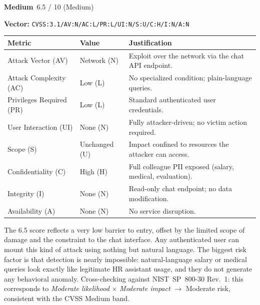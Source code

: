 \documentclass[12pt,a4paper]{report}
\newcommand{\badgemedium}{\colorbox{gray!15}{\footnotesize\textbf{Medium}}}
\newcommand{\cvssvec}[1]{\texttt{\small #1}}
\begin{document}
\begin{cvssbox}{\badgemedium\ 6.5 / 10 (Medium)}
\vspace{2pt}
\begin{center}
\textbf{Vector:}\enspace
\cvssvec{CVSS:3.1/AV:N/AC:L/PR:L/UI:N/S:U/C:H/I:N/A:N}
\end{center}
\vspace{8pt}
\begin{tabular}{W{3.4cm}W{2.2cm}W{7.8cm}}
\toprule
  
  \small\textbf{Metric} &
  \small\textbf{Value} &
  \small\textbf{Justification} \\
  \midrule
  
  \small Attack Vector (AV)     & \small Network (N) & \small Exploit over the network via the chat API endpoint. \\
  
  \small Attack Complexity (AC) & \small Low (L)     & \small No specialized condition; plain-language queries. \\
  
  \small Privileges Required (PR)  & \small Low (L) & \small Standard authenticated user credentials. \\
  
  \small User Interaction (UI)  & \small None (N)    & \small Fully attacker-driven; no victim action required. \\
  
  \small Scope (S)              & \small Unchanged (U) & \small Impact confined to resources the attacker can access. \\
  
  \small Confidentiality (C)    & \small High (H)    & \small Full colleague PII exposed (salary, medical, evaluation). \\
  
  \small Integrity (I)          & \small None (N)    & \small Read-only chat endpoint; no data modification. \\
  
  \small Availability (A)       & \small None (N)    & \small No service disruption. \\
  \bottomrule
\end{tabular}
\vspace{6pt}

\small The 6.5 score reflects a very low barrier to entry, offset by the
limited scope of damage and the constraint to the chat interface. Any
authenticated user can mount this kind of attack using nothing but natural
language. The biggest risk factor is that detection is nearly
impossible: natural-language salary or medical queries look exactly like
legitimate HR assistant usage, and they do not generate any behavioral
anomaly. Cross-checking against NIST~SP~800-30 Rev.~1: this corresponds
to \emph{Moderate likelihood} $\times$ \emph{Moderate impact}
$\to$ Moderate risk, consistent with the CVSS Medium band.
\end{cvssbox}
\end{document}
